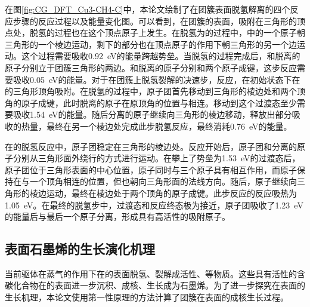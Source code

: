     在图\ref{fig:CG_DFT_Cu3-CH4-C}中，本论文绘制了在团簇表面脱氢解离的四个反应步骤的反应过程以及能量变化图。可以看到，在团簇的表面，吸附在三角形的顶点处，脱氢的过程也在这个顶点原子上发生。在脱氢为的过程中，中的一个原子朝三角形的一个棱边运动，剩下的部分也在顶点原子的作用下朝三角形的另一个边运动。这个过程需要吸收\SI{0.92}{\electronvolt}的能量跨越势垒。当脱氢的过程完成后，和脱离的原子分别立于团簇三角形的两边。和脱离的原子分别和两个原子成键，这步反应需要吸收\SI{0.05}{\electronvolt}的能量。对于在团簇上脱氢裂解的决速步，反应，在初始状态下在的三角形顶角吸附。在脱氢的过程中，原子团首先移动到三角形的棱边处和两个顶角的原子成键，此时脱离的原子在原顶角的位置与相连。移动到这个过渡态至少需要吸收\SI{1.54}{\electronvolt}的能量。随后分离的原子继续向三角形的棱边移动，释放出部分吸收的热量，最终在另一个棱边处完成此步脱氢反应，最终消耗\SI{0.76}{\electronvolt}的能量。
    
    在的脱氢反应中，原子团稳定在三角形的棱边处。反应开始后，原子团和分离的原子分别从三角形面外绕行的方式进行运动。在攀上了势垒为\SI{1.53}{\electronvolt}的过渡态后，原子团位于三角形表面的中心位置，原子同时与三个原子具有相互作用，而原子保持在与一个顶角相连的位置，但也朝向三角形面的法线方向。随后，原子继续向三角形的棱边运动，最终在棱边处于两个顶角的原子成键。此步反应的反应吸热为\SI{1.05}{\electronvolt}。在最终的脱氢步中，过渡态和反应终态极为接近，原子团吸收了\SI{1.23}{\electronvolt}的能量后与最后一个原子分离，形成具有高活性的吸附原子。
    
    \subsection{表面石墨烯的生长演化机理}
    
    当前驱体在蒸气的作用下在的表面脱氢、裂解成活性、等物质。这些具有活性的含碳化合物在的表面进一步沉积、成核、生长成为石墨烯。为了进一步探究在表面的生长机理，本论文使用第一性原理的方法计算了团簇在表面的成核生长过程。
    
